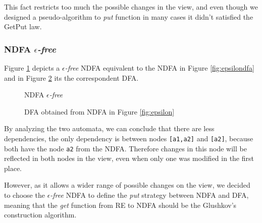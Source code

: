 This fact restricts too much the possible changes in the view, and even though we designed a pseudo-algorithm to \textit{put} function in many cases it didn't satisfied the GetPut law. 

\subsubsection{NDFA \textit{$\epsilon$-free}} Figure \ref{fig:glundfa} depicts a \textit{$\epsilon$-free} NDFA equivalent to the NDFA in Figure \ref{fig:epsilondfa} and in Figure \ref{fig:gludfa} its the correspondent DFA. 

\begin{figure}[H]
    \centering
    \caption{NDFA \textit{$\epsilon$-free}}
    \label{fig:glundfa}
\end{figure}

\begin{figure}
    \centering
    \caption{DFA obtained from NDFA in Figure \ref{fig:epsilon}}
    \label{fig:gludfa}
\end{figure}

By analyzing the two automata, we can conclude that there are less dependencies, the only dependency is between nodes \texttt{[a1,a2]} and \texttt{[a2]}, because both have the node \texttt{a2} from the NDFA. Therefore changes in this node will be reflected in both nodes in the view, even when only one was modified in the first place. 

However, as it allows a wider range of possible changes on the view, we decided to choose the \textit{$\epsilon$-free} NDFA to define the \textit{put} strategy between NDFA and DFA, meaning that the \textit{get} function from RE to NDFA should be the Glushkov's construction algorithm. 

